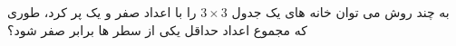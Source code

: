 \exercise
به چند روش می توان خانه های یک جدول
$3\times3$
را با اعداد صفر و یک پر کرد، طوری که مجموع اعداد حداقل یکی از سطر ها برابر صفر شود؟